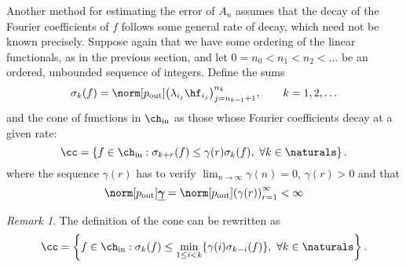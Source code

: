 \documentclass[final]{elsarticle}
\newcommand{\chin}{\ch_{\text{\rm{in}}}}
\newcommand{\pout}{p_{\text{\rm{out}}}}
\newcommand{\bgamma}{\underline{\boldsymbol\gamma}}
\theoremstyle{definition}
\theoremstyle{remark}
\newtheorem{rem}{Remark}
\begin{document}
Another method for estimating the error of $A_n$ assumes that the decay of the Fourier coefficients of $f$ follows some general rate of decay, which need not be known precisely.  Suppose again that we have some ordering of the linear functionals, as in the previous section, and let $0=n_0 < n_1 < n_2 < \ldots$ be an ordered, unbounded sequence of integers.  Define the sums
\begin{equation} \label{sumdef}
\sigma_k(f) = \norm[\pout]{ \left(\lambda_{i_j} \hf_{i_j} \right)_{j=n_{k-1}+1}^{n_k}}, \qquad k=1, 2, \ldots
\end{equation}
and the cone of functions in $\chin$ as those whose Fourier coefficients decay at a given rate:
\begin{equation} \label{decayconedef}
\cc = \left\{ f \in \chin : \sigma_{k+r}(f) \le \gamma(r) \sigma_k (f), \ \forall k \in \naturals \right\}.
\end{equation}
where the sequence $\gamma(r)$ has to verify $\lim_{n\rightarrow\infty}\gamma(n)=0$, $\gamma(r) > 0$ and that
\begin{equation} \label{constcone}
\norm[\pout]{\bgamma}=\norm[\pout]{ \left(\gamma(r)\right)_{r=1}^\infty}<\infty
\end{equation}

\begin{rem}
The definition of the cone can be rewritten as
\begin{equation}\label{coneredef}
\cc = \left\{ f \in \chin : \sigma_k(f) \le \min_{1 \le i < k}\{\gamma(i)\sigma_{k-i}(f)\}, \ \forall k \in \naturals \right\}.
\end{equation}
\end{rem}
\end{document}
